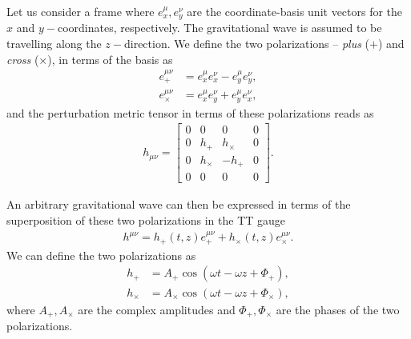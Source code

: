 Let us consider a frame where $e_{x}^{\mu}, e_y^{\nu}$ are the coordinate-basis unit vectors for the $x$ and $y-$coordinates, respectively. The gravitational wave is assumed to be travelling along the $z-$direction. We define the two polarizations -- \textit{plus} ($+$) and \textit{cross} ($\times$), in terms of the basis as
\begin{align}
    e_{+}^{\mu\nu} &= e_x^{\mu}e_x^{\nu} - e_y^{\mu}e_y^{\nu},\\
    e_{\times}^{\mu\nu} &= e_x^{\mu}e_y^{\nu} + e_y^{\mu}e_x^{\nu},
\end{align}
and the perturbation metric tensor in terms of these polarizations reads as 
\begin{align}
   h_{\mu\nu} =  \begin{bmatrix}
                0 & 0 & 0 & 0 \\
                0 & h_+ & h_{\times} & 0 \\
                0 & h_{\times} & -h_+ & 0 \\
                0 & 0 & 0 & 0 
                \end{bmatrix}.
\end{align}

An arbitrary gravitational wave can then be expressed in terms of the superposition of these two polarizations in the TT gauge
\begin{align}
    h^{\mu\nu} = h_+(t,z)e^{\mu\nu}_{+} + h_{\times}(t,z)e_{\times}^{\mu\nu}.
\end{align}
We can define the two polarizations as
\begin{align}
    h_+ &= A_{+}\cos(\omega t -\omega z + \Phi_+), \\
    h_{\times} &= A_{\times}\cos(\omega t -\omega z + \Phi_{\times}),
\end{align}
where $A_{+}, A_{\times}$ are the complex amplitudes and $\Phi_+, \Phi_{\times}$ are the phases of the two polarizations. 

